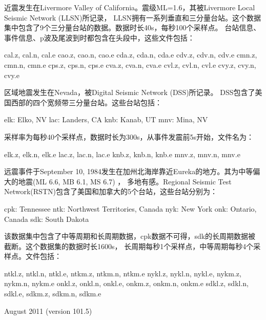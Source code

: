 近震发生在Livermore Valley of California。震级ML=1.6，其被Livermore Local Seismic Network (LLSN)所记录，
LLSN拥有一系列垂直和三分量台站。这个数据集中包含了9个三分量台站的数据。数据时长40s，每秒100个采样点。
台站信息、事件信息、p波及尾波到时都包含在头段中，这些文件包括：
\begin{SACCode}
    cal.z, cal.n, cal.e
    cao.z, cao.n, cao.e
    cda.z, cda.n, cda.e
    cdv.z, cdv.n, cdv.e
    cmn.z, cmn.n, cmn.e
    cps.z, cps.n, cps.e
    cva.z, cva.n, cva.e
    cvl.z, cvl.n, cvl.e
    cvy.z, cvy.n, cvy.e
\end{SACCode}

区域地震发生在Nevada，被Digital Seismic Network (DSS)所记录。 DSS包含了美国西部的四个宽频带三分量台站。这些台站包括：
\begin{SACCode}
   		elk: Elko, NV
   		lac: Landers, CA
   		knb: Kanab, UT
   		mnv: Mina, NV
\end{SACCode}
采样率为每秒40个采样点，数据时长为300s，从事件发震前5s开始，文件名为：
\begin{SACCode}
    elk.z, elk.n, elk.e
    lac.z, lac.n, lac.e
    knb.z, knb.n, knb.e
    mnv.z, mnv.n, mnv.e
\end{SACCode}

远震事件于September 10, 1984发生在加州北海岸靠近Eureka的地方。其为中等偏大的地震(ML 6.6, MB 6.1, MS 6.7) ，
多地有感。Regional Seismic Test Network(RSTN)包含了美国和加拿大的5个台站，这些台站分别为：
\begin{SACCode} 
	cpk: Tennessee
    ntk: Northwest Territories, Canada
    nyk: New York
    onk: Ontario, Canada
    sdk: South Dakota
\end{SACCode}
该数据集中包含了中等周期和长周期数据，cpk数据不可得，sdk的长周期数据被截断。这个数据集的数据时长1600s，
长周期每秒1个采样点，中等周期每秒4个采样点。文件包括：
\begin{SACCode} 
    ntkl.z, ntkl.n, ntkl.e, ntkm.z, ntkm.n, ntkm.e
    nykl.z, nykl.n, nykl.e, nykm.z, nykm.n, nykm.e
    onkl.z, onkl.n, onkl.e, onkm.z, onkm.n, onkm.e
    sdkl.z, sdkl.n, sdkl.e, sdkm.z, sdkm.n, sdkm.e
\end{SACCode}

August 2011 (version 101.5)
